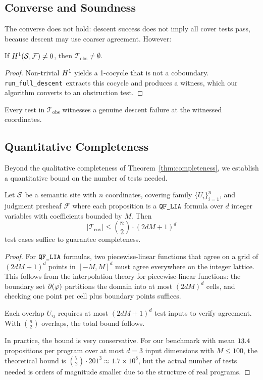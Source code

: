 \documentclass[11pt]{article}
\newcommand{\RunDescent}{\texttt{run\_full\_descent}}
\newcommand{\CoverSuite}{\mathcal{T}_{\mathrm{cov}}}
\newcommand{\ObstrSuite}{\mathcal{T}_{\mathrm{obs}}}
\begin{document}
\subsection{Converse and Soundness}
The converse does not hold: descent success does not imply all cover tests
pass, because descent may use coarser agreement.  However:

\begin{lemma}\label{lem:obstr-detection}
If $H^{1}(\mathcal{S}, \mathcal{F}) \neq 0$, then $\ObstrSuite \neq \emptyset$.
\end{lemma}

\begin{proof}
Non-trivial $H^{1}$ yields a 1-cocycle that is not a coboundary.
\RunDescent\ extracts this cocycle and produces a witness, which our
algorithm converts to an obstruction test.
\end{proof}

\begin{corollary}[Soundness]\label{cor:soundness}
Every test in $\ObstrSuite$ witnesses a genuine descent failure at the
witnessed coordinates.
\end{corollary}

\subsection{Quantitative Completeness}\label{sec:quant-complete}

Beyond the qualitative completeness of Theorem~\ref{thm:completeness},
we establish a quantitative bound on the number of tests needed.

\begin{theorem}\label{thm:quant-completeness}
Let $\mathcal{S}$ be a semantic site with $n$ coordinates, covering family
$\{U_i\}_{i=1}^n$, and judgment presheaf $\mathcal{F}$ where each
proposition is a $\texttt{QF\_LIA}$ formula over $d$ integer variables with
coefficients bounded by $M$.  Then
\[
  |\CoverSuite| \leq \binom{n}{2} \cdot (2dM + 1)^d
\]
test cases suffice to guarantee completeness.
\end{theorem}

\begin{proof}
For $\texttt{QF\_LIA}$ formulas, two piecewise-linear functions that agree on a
grid of $(2dM+1)^d$ points in $[-M,M]^d$ must agree everywhere on the
integer lattice.  This follows from the interpolation theory for
piecewise-linear functions: the boundary set $\partial(\varphi)$ partitions
the domain into at most $(2dM)^d$ cells, and checking one point per cell
plus boundary points suffices.

Each overlap $U_{ij}$ requires at most $(2dM+1)^d$ test inputs to
verify agreement.  With $\binom{n}{2}$ overlaps, the total bound follows.

In practice, the bound is very conservative.  For our benchmark with
mean $13.4$ propositions per program over at most $d = 3$
input dimensions with $M \leq 100$, the theoretical bound is
$\binom{7}{2} \cdot 201^3 \approx 1.7 \times 10^8$, but the actual
number of tests needed is orders of magnitude smaller due to the
structure of real programs.
\end{proof}
\end{document}
